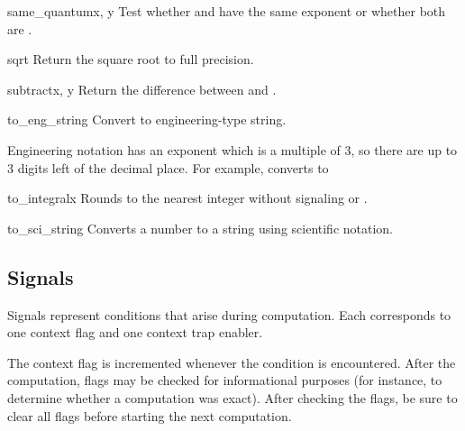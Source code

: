 \begin{methoddesc}{same_quantum}{x, y}
  Test whether  and  have the same exponent or whether both are
  .
\end{methoddesc}

\begin{methoddesc}{sqrt}{}
  Return the square root to full precision.
\end{methoddesc}                    

\begin{methoddesc}{subtract}{x, y}
  Return the difference between  and .
\end{methoddesc}
 
\begin{methoddesc}{to_eng_string}{}
  Convert to engineering-type string.

  Engineering notation has an exponent which is a multiple of 3, so there
  are up to 3 digits left of the decimal place.  For example, converts
   to 
\end{methoddesc}  

\begin{methoddesc}{to_integral}{x}                  
  Rounds to the nearest integer without signaling 
  or .                                        
\end{methoddesc} 

\begin{methoddesc}{to_sci_string}{}
  Converts a number to a string using scientific notation.
\end{methoddesc} 



\subsection{Signals \label{decimal-signals}}

Signals represent conditions that arise during computation.
Each corresponds to one context flag and one context trap enabler.

The context flag is incremented whenever the condition is encountered.
After the computation, flags may be checked for informational
purposes (for instance, to determine whether a computation was exact).
After checking the flags, be sure to clear all flags before starting
the next computation.

